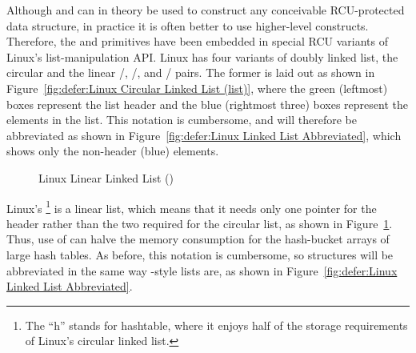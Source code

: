 Although  and
 can in theory be used to construct any
conceivable RCU-protected data structure, in practice it is often better
to use higher-level constructs.
Therefore, the  and
primitives have been embedded in special RCU variants of Linux's
list-manipulation API.
Linux has four variants of doubly linked list, the circular
 and the linear
/,
/, and
/
pairs.
The former is laid out as shown in
Figure~\ref{fig:defer:Linux Circular Linked List (list)},
where the green (leftmost) boxes represent the list header and the blue
(rightmost three) boxes represent the elements in the list.
This notation is cumbersome, and will therefore be abbreviated as shown in
Figure~\ref{fig:defer:Linux Linked List Abbreviated},
which shows only the non-header (blue) elements.

\begin{figure}[tb]
\centering
{}
\caption{Linux Linear Linked List ()}
\label{fig:defer:Linux Linear Linked List (hlist)}
\end{figure}

Linux's \footnote{
	The ``h'' stands for hashtable, where it enjoys half of the
	storage requirements of Linux's circular linked list.}
is a linear list, which means that
it needs only one pointer for the header rather than the two
required for the circular list, as shown in
Figure~\ref{fig:defer:Linux Linear Linked List (hlist)}.
Thus, use of  can halve the memory consumption for the hash-bucket
arrays of large hash tables.
As before, this notation is cumbersome, so  structures will
be abbreviated in the same way -style lists are, as shown in
Figure~\ref{fig:defer:Linux Linked List Abbreviated}.

